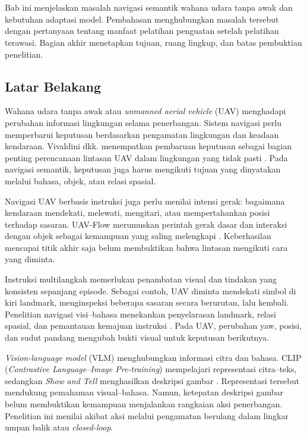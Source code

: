 \chapter{\babSatu}
\label{cha:pendahuluan}
Bab ini menjelaskan masalah navigasi semantik wahana udara tanpa awak dan kebutuhan adaptasi model. Pembahasan menghubungkan masalah tersebut dengan pertanyaan tentang manfaat pelatihan penguatan setelah pelatihan terawasi. Bagian akhir menetapkan tujuan, ruang lingkup, dan batas pembuktian penelitian.

\section{Latar Belakang}
\label{sec:latar_belakang}
Wahana udara tanpa awak atau \textit{unmanned aerial vehicle} (UAV) menghadapi perubahan informasi lingkungan selama penerbangan. Sistem navigasi perlu memperbarui keputusan berdasarkan pengamatan lingkungan dan keadaan kendaraan. Vivaldini dkk. menempatkan pembaruan keputusan sebagai bagian penting perencanaan lintasan UAV dalam lingkungan yang tidak pasti \citep{vivaldini2025decision}. Pada navigasi semantik, keputusan juga harus mengikuti tujuan yang dinyatakan melalui bahasa, objek, atau relasi spasial. %

Navigasi UAV berbasis instruksi juga perlu menilai intensi gerak: bagaimana kendaraan mendekati, melewati, mengitari, atau mempertahankan posisi terhadap sasaran. UAV-Flow merumuskan perintah gerak dasar dan interaksi dengan objek sebagai kemampuan yang saling melengkapi \citep{wang2025uavflow}. Keberhasilan mencapai titik akhir saja belum membuktikan bahwa lintasan mengikuti cara yang diminta. %

Instruksi multilangkah memerlukan penambatan visual dan tindakan yang konsisten sepanjang episode. Sebagai contoh, UAV diminta mendekati simbol di kiri landmark, menginspeksi beberapa sasaran secara berurutan, lalu kembali. Penelitian navigasi visi--bahasa menekankan penyelarasan landmark, relasi spasial, dan pemantauan kemajuan instruksi \citep{zhang2022explicit,ma2019selfmonitoring}. Pada UAV, perubahan yaw, posisi, dan sudut pandang mengubah bukti visual untuk keputusan berikutnya. %

\textit{Vision-language model} (VLM) menghubungkan informasi citra dan bahasa. CLIP (\textit{Contrastive Language--Image Pre-training}) mempelajari representasi citra--teks, sedangkan \textit{Show and Tell} menghasilkan deskripsi gambar \citep{radford2021clip,vinyals2015show}. Representasi tersebut mendukung pemahaman visual--bahasa. Namun, ketepatan deskripsi gambar belum membuktikan kemampuan menjalankan rangkaian aksi penerbangan. Penelitian ini menilai akibat aksi melalui pengamatan berulang dalam lingkar umpan balik atau \textit{closed-loop}. %

